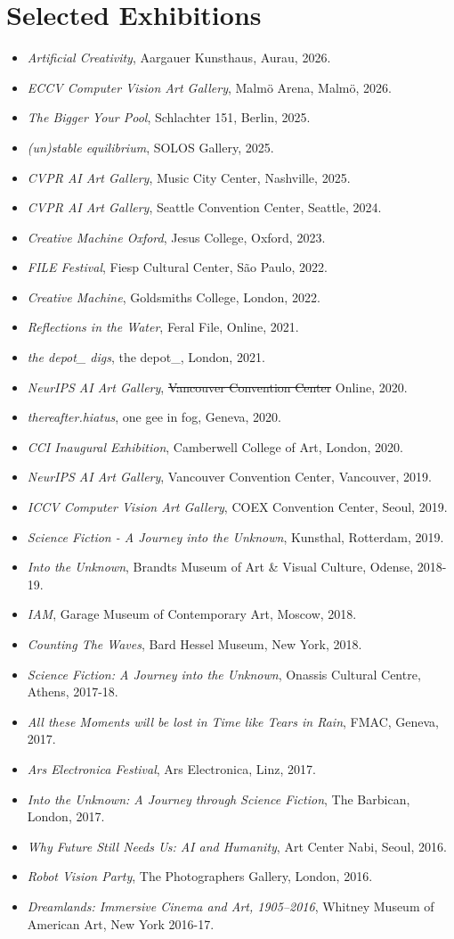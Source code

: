 \documentclass[letterpaper,11pt]{article}
\newcommand{\resumeItem}[2]{
  \item\small{
    \textbf{#1}{ #2 \vspace{-2pt}}
  }
}
\newcommand{\resumeSubItem}[2]{\resumeItem{#1}{#2}\vspace{-4pt}}
\newcommand{\resumeSubHeadingListStart}{\begin{itemize}[leftmargin=*]}
\newcommand{\resumeSubHeadingListEnd}{\end{itemize}}
\begin{document}
\section{Selected Exhibitions}
 \resumeSubHeadingListStart
 \resumeSubItem{}{\textit{Artificial Creativity}, Aargauer Kunsthaus, Aurau, 2026.}
 \resumeSubItem{}{\textit{ECCV Computer Vision Art Gallery}, Malmö Arena, Malmö, 2026.}
 \resumeSubItem{}{\textit{The Bigger Your Pool}, Schlachter 151, Berlin, 2025.}
  \resumeSubItem{}{\textit{(un)stable equilibrium}, SOLOS Gallery, 2025.}
  \resumeSubItem{}{\textit{CVPR AI Art Gallery}, Music City Center, Nashville, 2025.}
  \resumeSubItem{}{\textit{CVPR AI Art Gallery}, Seattle Convention Center, Seattle, 2024.}
  \resumeSubItem{}{\textit{Creative Machine Oxford}, Jesus College, Oxford, 2023.}
  \resumeSubItem{}{\textit{FILE Festival}, Fiesp Cultural Center, São Paulo, 2022.}
  \resumeSubItem{}{\textit{Creative Machine}, Goldsmiths College, London, 2022.}
  \resumeSubItem{}{\textit{Reflections in the Water}, Feral File, Online, 2021.}
  \resumeSubItem{}{\textit{the depot\_ digs}, the depot\_, London, 2021.}
  \resumeSubItem{}{\textit{NeurIPS AI Art Gallery}, \sout{Vancouver Convention Center} Online, 2020.}
  \resumeSubItem{}{\textit{thereafter.hiatus}, one gee in fog, Geneva, 2020. }
  \resumeSubItem{}{\textit{CCI Inaugural Exhibition}, Camberwell College of Art, London, 2020. }
  \resumeSubItem{}{\textit{NeurIPS AI Art Gallery}, Vancouver Convention Center, Vancouver, 2019.}
  \resumeSubItem{}{\textit{ICCV Computer Vision Art Gallery}, COEX Convention Center, Seoul, 2019. }
  \resumeSubItem{}{\textit{Science Fiction - A Journey into the Unknown}, Kunsthal, Rotterdam, 2019.}
  \resumeSubItem{}{\textit{Into the Unknown}, Brandts Museum of Art \& Visual Culture, Odense, 2018-19.}
  \resumeSubItem{}{\textit{IAM}, Garage Museum of Contemporary Art, Moscow, 2018.}
  \resumeSubItem{}{\textit{Counting The Waves}, Bard Hessel Museum, New York, 2018. }
  \resumeSubItem{}{\textit{Science Fiction: A Journey into the Unknown}, Onassis Cultural Centre, Athens, 2017-18.}
  \resumeSubItem{}{\textit{All these Moments will be lost in Time like Tears in Rain}, FMAC, Geneva, 2017. }
  \resumeSubItem{}{\textit{Ars Electronica Festival}, Ars Electronica, Linz, 2017. }
  \resumeSubItem{}{\textit{Into the Unknown: A Journey through Science Fiction}, The Barbican, London, 2017.}
  \resumeSubItem{}{\textit{Why Future Still Needs Us: AI and Humanity}, Art Center Nabi, Seoul, 2016.}
  \resumeSubItem{}{\textit{Robot Vision Party}, The Photographers Gallery, London, 2016.}
  \resumeSubItem{}{\textit{Dreamlands: Immersive Cinema and Art, 1905–2016}, Whitney Museum of American Art, New York 2016-17.}
 \resumeSubHeadingListEnd
\end{document}
